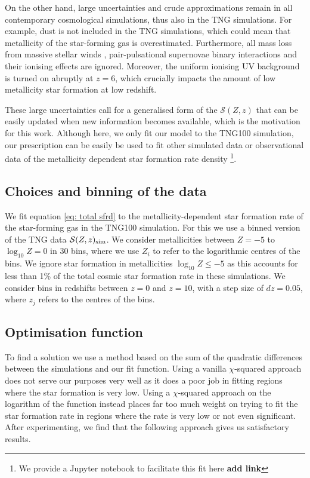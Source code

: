 \documentclass[twocolumn]{aastex631}
\newcommand{\SFRDzZ}{\ensuremath{\mathcal{S}(Z,z)}\xspace}
\newcommand{\todo}[1]{{\color{purple}\bf{#1}}}
\begin{document}
On the other hand, large uncertainties and crude approximations remain in all contemporary cosmological simulations, thus also in the TNG simulations. For example, dust is not included in the TNG simulations, which could mean that metallicity of the star-forming gas is overestimated. Furthermore, all mass loss from massive stellar winds \citep[e.g.][]{Dray+2003}, pair-pulsational supernovae \citep[e.g.][]{Renzo+2020} binary interactions \citep[e.g.][]{Farmer2021_carbonfootprint} and their ionising effects \citep[][]{Gotberg+2020,DoughtyFinlator2021} are ignored.  Moreover, the uniform ionising UV background is turned on abruptly at $z=6$, which crucially impacts the amount of low metallicity star formation at low redshift.

These large uncertainties call for a generalised form of the \SFRDzZ that can be easily updated when new information becomes available, which is the motivation for this work. Although here, we only fit our model to the TNG100 simulation, our prescription can be easily be used to fit other simulated data or observational data of the metallicity dependent star formation rate density \footnote{We provide a Jupyter notebook to facilitate this fit here \todo{add link}}. 


\subsection{Choices and binning of the data}
We fit equation \ref{eq: total sfrd} to the metallicity-dependent star formation rate of the star-forming gas in the TNG100 simulation. For this we use a binned version of the TNG data $\SFRDzZ_{\rm sim}$. We consider metallicities between $Z= -5$ to $\log_{10} Z= 0$ in 30 bins, where we use $Z_i$ to refer to the logarithmic centres of the bins. We ignore star formation in metallicities $\log_{10} Z \le -5$ as this accounts for less than 1\% of the total cosmic star formation rate in these simulations.
We consider bins in redshifts between $z=0$ and $z=10$, with a step size of $dz=0.05$, where $z_j$ refers to the centres of the bins. 

\subsection{Optimisation function}
To find a solution we use a method based on the sum of the quadratic differences between the simulations and our fit function. Using a vanilla $\chi$-squared approach does not serve our purposes very well as it does a poor job in fitting regions where the star formation is very low.  Using a $\chi$-squared approach on the logarithm of the function instead places far too much weight on trying to fit the star formation rate in regions where the rate is very low or not even significant.  After experimenting, we find that the following approach gives us satisfactory results. 
\end{document}

